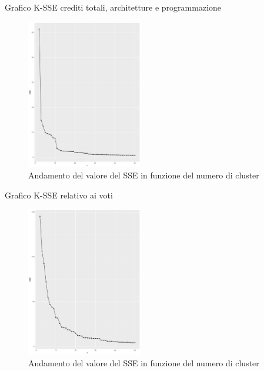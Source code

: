 \documentclass{beamer}
\begin{document}
\begin{frame}{Grafico K-SSE crediti totali, architetture e programmazione}
    \begin{figure}[bt]
      \begin{center}
      \includegraphics[width = 0.45\textwidth]{../img/k-sse-crediti-totali-arc-prg.pdf}
      \caption{Andamento del valore del SSE in funzione del numero di cluster}
      \end{center}
    \end{figure}
\end{frame}

\begin{frame}{Grafico K-SSE relativo ai voti}
  \begin{figure}[bt]
    \begin{center}
    \includegraphics[width = 0.45\textwidth]{../img/k-sse-asd-arc-prg-an1-mdl.pdf}
    \caption{Andamento del valore del SSE in funzione del numero di cluster}
    \end{center}
  \end{figure}
\end{frame}
\end{document}
